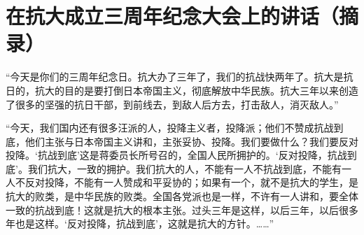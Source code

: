 \section[在抗大成立三周年纪念大会上的讲话（摘录）（一九三九年六月一日）]{在抗大成立三周年纪念大会上的讲话（摘录）}


“今天是你们的三周年纪念日。抗大办了三年了，我们的抗战快两年了。抗大是抗日的，抗大的目的是要打倒日本帝国主义，彻底解放中华民族。抗大三年以来创造了很多的坚强的抗日干部，到前线去，到敌人后方去，打击敌人，消灭敌人。”

“今天，我们国内还有很多汪派的人，投降主义者，投降派；他们不赞成抗战到底，他们主张与日本帝国主义讲和，主张妥协、投降。我们要做什么？我们要反对投降。‘抗战到底’这是蒋委员长所号召的，全国人民所拥护的。‘反对投降，抗战到底’。我们抗大，一致的拥护。我们抗大的人，不能有一人不抗战到底，不能有一人不反对投降，不能有一人赞成和平妥协的；如果有一个，就不是抗大的学生，是抗大的败类，是中华民族的败类。全国各党派也是一样，不许有一人讲和，要全体一致的抗战到底！这就是抗大的根本主张。过头三年是这样，以后三年，以后很多年也是这样。‘反对投降，抗战到底’，这就是抗大的方针。……”


